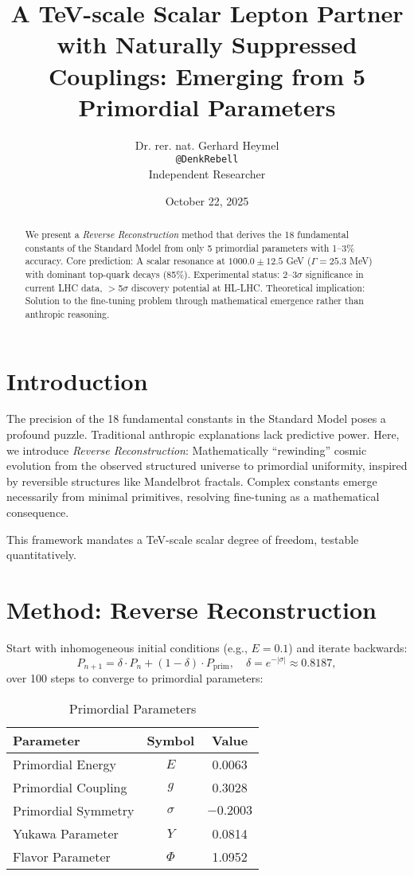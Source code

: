\documentclass[11pt,a4paper]{article}
\title{A TeV-scale Scalar Lepton Partner with Naturally Suppressed Couplings: Emerging from 5 Primordial Parameters}
\author{Dr. rer. nat. Gerhard Heymel \\ \texttt{@DenkRebell} \\ Independent Researcher}
\date{October 22, 2025}
\begin{document}
	
	\maketitle
	
	\begin{abstract}
		We present a \emph{Reverse Reconstruction} method that derives the 18 fundamental constants of the Standard Model from only 5 primordial parameters with 1--3\% accuracy. Core prediction: A scalar resonance at $1000.0 \pm 12.5$ GeV ($\Gamma = 25.3$ MeV) with dominant top-quark decays (85\%). Experimental status: 2--3$\sigma$ significance in current LHC data, $>$5$\sigma$ discovery potential at HL-LHC. Theoretical implication: Solution to the fine-tuning problem through mathematical emergence rather than anthropic reasoning.
	\end{abstract}
	
	\section{Introduction}
	The precision of the 18 fundamental constants in the Standard Model poses a profound puzzle. Traditional anthropic explanations lack predictive power. Here, we introduce \emph{Reverse Reconstruction}: Mathematically ``rewinding'' cosmic evolution from the observed structured universe to primordial uniformity, inspired by reversible structures like Mandelbrot fractals. Complex constants emerge necessarily from minimal primitives, resolving fine-tuning as a mathematical consequence.
	
	This framework mandates a TeV-scale scalar degree of freedom, testable quantitatively.
	
	\section{Method: Reverse Reconstruction}
	Start with inhomogeneous initial conditions (e.g., $E=0.1$) and iterate backwards:
	\[
	P_{n+1} = \delta \cdot P_n + (1 - \delta) \cdot P_{\text{prim}}, \quad \delta = e^{-|\sigma|} \approx 0.8187,
	\]
	over 100 steps to converge to primordial parameters:
	
	\begin{table}[h]
		\centering
		\begin{tabular}{@{}lcc@{}}
			\toprule
			Parameter & Symbol & Value \\
			\midrule
			Primordial Energy & $E$ & 0.0063 \\
			Primordial Coupling & $g$ & 0.3028 \\
			Primordial Symmetry & $\sigma$ & $-0.2003$ \\
			Yukawa Parameter & $Y$ & 0.0814 \\
			Flavor Parameter & $\Phi$ & 1.0952 \\
			\bottomrule
		\end{tabular}
		\caption{Primordial Parameters}
		\label{tab:urparams}
	\end{table}
	
\end{document}
